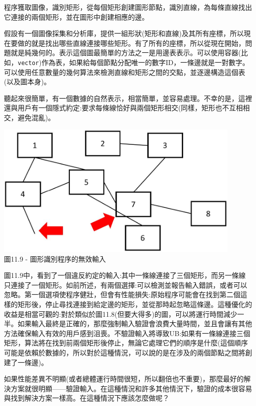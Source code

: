 程序獲取圖像，識別矩形，從每個矩形創建圖形節點，識別直線，為每條直線找出它連接的兩個矩形，並在圖形中創建相應的邊。

假設有一個圖像採集和分析庫，提供一組形狀(矩形和直線)及其所有座標，所以現在要做的就是找出哪些直線連接哪些矩形。有了所有的座標，所以從現在開始，問題就是純幾何的。表示這個圖最簡單的方法之一是用邊表表示。可以使用容器(比如，\texttt{vector})作為表，如果給每個節點分配唯一的數字ID，一條邊就是一對數字。可以使用任意數量的幾何算法來檢測直線和矩形之間的交點，並逐邊構造這個表(以及圖本身)。

聽起來很簡單，有一個數據的自然表示，相當簡單，並容易處理。不幸的是，這裡還與用戶有一個隱式約定:要求每條線恰好與兩個矩形相交(同樣，矩形也不互相相交，避免混亂)。 

\begin{center}
\includegraphics[width=0.9\textwidth]{content/3/chapter11/images/9.jpg}\\
圖11.9 - 圖形識別程序的無效輸入
\end{center}

圖11.9中，看到了一個違反約定的輸入:其中一條線連接了三個矩形，而另一條線只連接了一個矩形。如前所述，有兩個選擇:可以檢測並報告輸入錯誤，或者可以忽略。第一個選項使程序健壯，但會有性能損失:原始程序可能會在找到第二個這樣的矩形後，停止尋找連接到給定邊的矩形，並從那時起忽略這條邊。這種優化的收益是相當可觀的:對於類似於圖11.8(但要大得多)的圖，可以將運行時間減少一半。如果輸入最終是正確的，那麼強制輸入驗證會浪費大量時間，並且會讓有其他方法確保輸入有效的用戶感到沮喪。不驗證輸入將導致UB:如果有一條線連接三個矩形，算法將在找到前兩個矩形後停止，無論它處理它們的順序是什麼(這個順序可能是依賴於數據的，所以對於這種情況，可以說的是在涉及的兩個節點之間將創建了一條邊)。

如果性能差異不明顯(或者總體運行時間很短，所以翻倍也不重要)，那麼最好的解決方案就很明顯——驗證輸入。在這種情況和許多其他情況下，驗證的成本很容易與找到解決方案一樣高。在這種情況下應該怎麼做呢？


